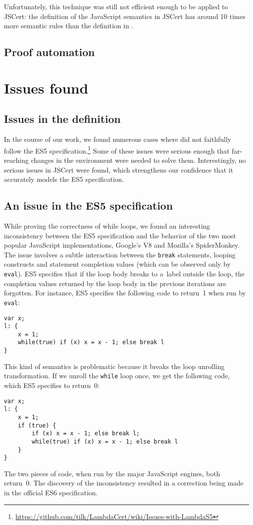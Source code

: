 \documentclass{llncs}
\newcommand{\jsinline}[1]{\texttt{#1}}
\begin{document}
Unfortunately, this technique was still not efficient enough to be
applied to JSCert: the definition of the JavaScript semantics in
JSCert has around 10 times more semantic rules than the definition
in \lambdajs.

\subsection{Proof automation}

\section{Issues found}

\subsection{Issues in the \lambdajs definition}

In the course of our work, we found numerous cases where
\lambdajs did not faithfully follow the ES5 
specification.\footnote{\url{https://github.com/tilk/LambdaCert/wiki/Issues-with-LambdaS5}}
Some of these issues were serious enough that
far-reaching changes in the \lambdajs environment were needed
to solve them. Interestingly, no serious issues in JSCert were
found, which strengthens our confidence that it accurately models
the ES5 specification.

\subsection{An issue in the ES5 specification}

While proving the correctness of while loops, we found an interesting
inconsistency between the ES5 specification and the behavior
of the two most popular JavaScript implementations, Google's V8 and
Mozilla's SpiderMonkey. The issue involves a subtle interaction
between the \jsinline{break} statements, looping constructs
and statement completion values (which can be observed only by \jsinline{eval}).
ES5 specifies that if the loop body breaks to a~label outside the loop,
the completion values returned by the loop body in the previous iterations
are forgotten. For instance, ES5 specifies the following code to return~1 when run by \jsinline{eval}:
\begin{verbatim}
var x; 
l: { 
    x = 1; 
    while(true) if (x) x = x - 1; else break l 
}
\end{verbatim}
This kind of semantics is problematic because it breaks the loop unrolling
transformation. If we unroll the \jsinline{while} loop once, we get the
following code, which ES5 specifies to return~0:
\begin{verbatim}
var x; 
l: { 
    x = 1; 
    if (true) { 
        if (x) x = x - 1; else break l; 
        while(true) if (x) x = x - 1; else break l 
    }
}
\end{verbatim}
The two pieces of code, when run by the major JavaScript engines, both return~0.
The discovery of the inconsistency
resulted in a correction being made in the official ES6
specification\cite{esdiscuss:loop-unrolling}.
\end{document}
